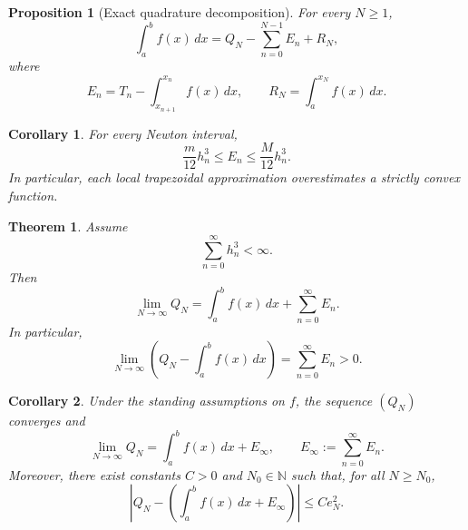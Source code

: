 \documentclass[10pt,a4paper]{amsart}
\newtheorem{proposition}{Proposition}
\newtheorem{corollary}{Corollary}
\newtheorem{theorem}{Theorem}
\begin{document}
\begin{proposition}[Exact quadrature decomposition]\label{prop: 3.1}
For every $N\ge1$,
\[
\int_a^bf(x)\,dx
=
Q_N
-
\sum_{n=0}^{N-1}E_n
+
R_N,
\]
where
\[
E_n
=
T_n-\int_{x_{n+1}}^{x_n}f(x)\,dx,
\qquad
R_N=\int_a^{x_N}f(x)\,dx.
\]
\end{proposition}

\begin{corollary}\label{cor: 3.3}
For every Newton interval,
\[
\frac{m}{12}h_n^3
\le
E_n
\le
\frac{M}{12}h_n^3.
\]
In particular, each local trapezoidal approximation overestimates a strictly
convex function.
\end{corollary}

\begin{theorem}\label{thm: 4.1}
Assume
\[
\sum_{n=0}^{\infty} h_n^3 < \infty.
\]
Then
\[
\lim_{N\to\infty} Q_N
=
\int_a^b f(x)\,dx
+
\sum_{n=0}^{\infty}E_n.
\]
In particular,
\[
\lim_{N\to\infty}
\left(
Q_N-\int_a^b f(x)\,dx
\right)
=
\sum_{n=0}^{\infty}E_n
>0.
\]
\end{theorem}

\begin{corollary}
Under the standing assumptions on $f$, the sequence $(Q_N)$ converges and
\[
\lim_{N\to\infty} Q_N
=
\int_a^b f(x)\,dx + E_\infty,
\qquad
E_\infty:=\sum_{n=0}^{\infty}E_n.
\]
Moreover, there exist constants $C>0$ and $N_0\in\mathbb{N}$ such that, for
all $N\geq N_0$,
\[
\left|
Q_N-
\left(
\int_a^b f(x)\,dx+E_\infty
\right)
\right|
\leq C e_N^2.
\]
\end{corollary}
\end{document}
